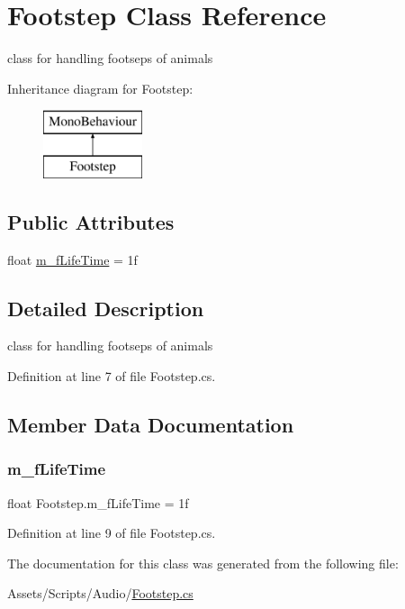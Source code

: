 \hypertarget{class_footstep}{}\section{Footstep Class Reference}
\label{class_footstep}


class for handling footseps of animals  


Inheritance diagram for Footstep\+:\begin{figure}[H]
\begin{center}
\leavevmode
\includegraphics[height=2.000000cm]{class_footstep}
\end{center}
\end{figure}
\subsection*{Public Attributes}
\begin{DoxyCompactItemize}
\item 
float \mbox{\hyperlink{class_footstep_ab047ebf81026d4cfb5642826c6d900e6}{m\+\_\+f\+Life\+Time}} = 1f
\end{DoxyCompactItemize}


\subsection{Detailed Description}
class for handling footseps of animals 



Definition at line 7 of file Footstep.\+cs.



\subsection{Member Data Documentation}
\mbox{\label{class_footstep_ab047ebf81026d4cfb5642826c6d900e6}} 
\subsubsection{\texorpdfstring{m\+\_\+f\+Life\+Time}{m\_fLifeTime}}
{\footnotesize\ttfamily float Footstep.\+m\+\_\+f\+Life\+Time = 1f}



Definition at line 9 of file Footstep.\+cs.



The documentation for this class was generated from the following file\+:\begin{DoxyCompactItemize}
\item 
Assets/\+Scripts/\+Audio/\mbox{\hyperlink{_footstep_8cs}{Footstep.\+cs}}\end{DoxyCompactItemize}

